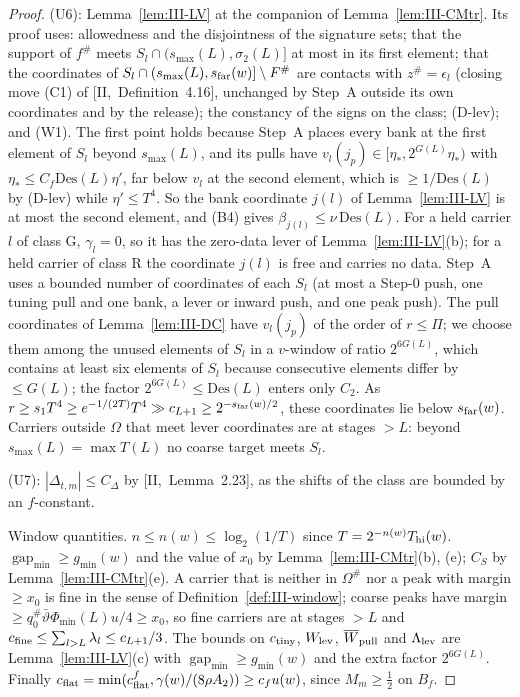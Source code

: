 \documentclass[10pt]{amsart}
\theoremstyle{definition}
\theoremstyle{remark}
\newcommand{\gap}{\operatorname{gap}}
\begin{document}
\begin{proof}
(U6): Lemma~\ref{lem:III-LV} at the companion of Lemma~\ref{lem:III-CMtr}.  Its
proof uses: allowedness and the disjointness of the signature sets; that the
support of $f^\#$ meets $S_l\cap(s_{\max}(L),\sigma_2(L)]$ at most in its first
element; that the coordinates of $S_l\cap(s_{\max}(L),s_{\rm far}(w)]\setminus F^\#$
are contacts with $z^\#=\epsilon_l$ (closing move (C1) of [II,~Definition~4.16],
unchanged by Step~A outside its own coordinates and by the release); the
constancy of the signs on the class; (D-lev); and (W1).  The first point holds
because Step~A places every bank at the first element of $S_l$ beyond
$s_{\max}(L)$, and its pulls have $v_l(j_p)\in[\eta_*,2^{G(L)}\eta_*)$ with
$\eta_*\le C_f\mathrm{Des}(L)\eta'$, far below $v_l$ at the second element, which is $\ge
1/\mathrm{Des}(L)$ by (D-lev) while $\eta'\le T^4$.  So the bank coordinate $j(l)$ of
Lemma~\ref{lem:III-LV} is at most the second element, and (B4) gives
$\beta_{j(l)}\le\nu\,\mathrm{Des}(L)$.  For a held carrier $l$ of class G,
$\gamma_l=0$, so it has the zero-data lever of Lemma~\ref{lem:III-LV}(b); for a
held carrier of class R the coordinate $j(l)$ is free and carries no data.
Step~A uses a bounded number of coordinates of each $S_l$ (at most a Step-0
push, one tuning pull and one bank, a lever or inward push, and one peak
push).  The pull coordinates of Lemma~\ref{lem:III-DC} have $v_l(j_p)$ of the
order of $r\le\Pi$; we choose them among the unused elements of $S_l$ in a
$v$-window of ratio $2^{6G(L)}$, which contains at least six elements of
$S_l$ because consecutive elements differ by $\le G(L)$; the factor
$2^{6G(L)}\le\mathrm{Des}(L)$ enters only $C_2$.  As $r\ge s_1T^4\ge
e^{-1/(2T)}T^4\gg c_{L+1}\ge2^{-s_{\rm far}(w)/2}$, these coordinates lie below
$s_{\rm far}(w)$.  Carriers outside $\Omega$ that meet lever coordinates are at
stages $>L$: beyond $s_{\max}(L)=\max T(L)$ no coarse target meets $S_l$.

(U7): $|\Delta_{t,m}|\le C_\Delta$ by [II,~Lemma~2.23], as the shifts of the
class are bounded by an $f$-constant.

Window quantities.  $n\le n(w)\le\log_2(1/T)$ since $T=2^{-n(w)}T_{\rm hi}(w)$.
$\gap_{\min}\ge g_{\min}(w)$ and the value of $x_0$ by
Lemma~\ref{lem:III-CMtr}(b), (e); $C_S$ by Lemma~\ref{lem:III-CMtr}(e).  A carrier
that is neither in $\Omega^\#$ nor a peak with margin $\ge x_0$ is fine
in the sense of Definition~\ref{def:III-window}; coarse peaks have margin
$\ge q^\#_0\bar\vartheta\Phi_{\min}(L)u/4\ge x_0$, so fine carriers are at stages
$>L$ and $c_{\rm fine}\le\sum_{l>L}\lambda_l\le c_{L+1}/3$.  The bounds on
$c_{\rm tiny}$, $W_{\rm lev}$, $\overline W_{\rm pull}$ and $\Lambda_{\rm lev}$ are
Lemma~\ref{lem:III-LV}(c) with $\gap_{\min}\ge g_{\min}(w)$ and the extra factor
$2^{6G(L)}$.  Finally $c_{\rm flat}=\min(c^f_{\rm flat},\gamma(w)/(8\rho A_2))\ge
c_fu(w)$, since $M_m\ge\frac12$ on $B_f$.
\end{proof}
\end{document}
